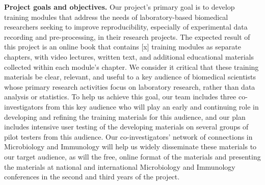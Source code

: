 \documentclass[pdftex,english,11pt,parskip=half]{scrartcl}
\begin{document}
\textbf{Project goals and objectives.} Our project's primary goal is to develop training modules that address the needs of laboratory-based biomedical researchers seeking to improve reproducibility, especially of experimental data recording and pre-processing, in their research projects. The expected result of this project is an online book that contains [x] training modules as separate chapters, with video lectures, written text, and additional educational materials collected within each module's chapter. We consider it critical that these training materials be clear, relevant, and useful to a key audience of biomedical scientists whose primary research activities focus on laboratory research, rather than data analysis or statistics. To help us achieve this goal, our team includes three co-investigators from this key audience who will play an early and continuing role in developing and refining the training materials for this audience, and our plan includes intensive user testing of the developing materials on several groups of pilot testers from this audience. Our co-investigators' network of connections in Microbiology and Immunology will help us widely disseminate these materials to our target audience, as will the free, online format of the materials and presenting the materials at national and international Microbiology and Immunology conferences in the second and third years of the project.
\end{document}
